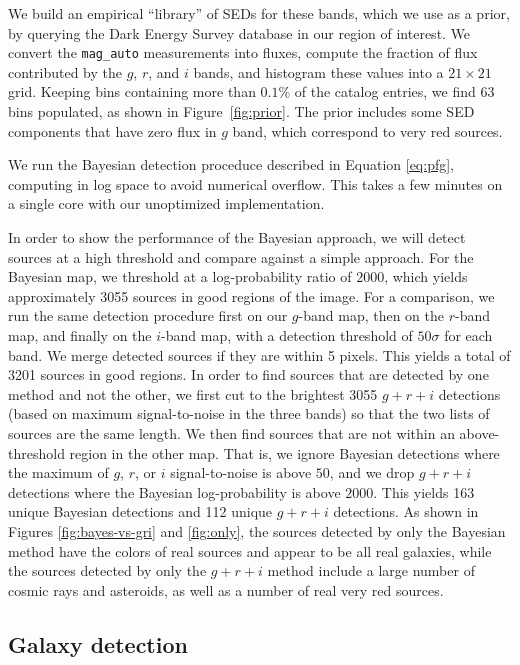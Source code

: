 \documentclass[letterpaper,preprint]{aastex62}
\newcommand{\figref}[1]{\mbox{Figure~\ref{#1}}}
\begin{document}
We build an empirical ``library'' of SEDs for these bands, which we
use as a prior, by querying the Dark Energy Survey database in our
region of interest.  We convert the \texttt{mag\_auto} measurements
into fluxes, compute the fraction of flux contributed by the $g$, $r$,
and $i$ bands, and histogram these values into a $21 \times 21$ grid.
Keeping bins containing more than $0.1 \%$ of the catalog entries, we
find 63 bins populated, as shown in \figref{fig:prior}.  The prior
includes some SED components that have zero flux in $g$ band, which
correspond to very red sources.


We run the Bayesian detection proceduce described in Equation
\ref{eq:pfg}, computing in log space to avoid numerical overflow.
This takes a few minutes on a single core with our unoptimized
implementation.


In order to show the performance of the Bayesian approach, we will
detect sources at a high threshold and compare against a simple
approach.  For the Bayesian map, we threshold at a log-probability
ratio of $2000$, which yields approximately 3055 sources in good
regions of the image.  For a comparison, we run the same detection
procedure first on our $g$-band map, then on the $r$-band map, and
finally on the $i$-band map, with a detection threshold of $50 \sigma$
for each band.  We merge detected sources if they are within 5 pixels.
This yields a total of 3201 sources in good regions.  In order to find
sources that are detected by one method and not the other, we first
cut to the brightest 3055 $g+r+i$ detections (based on maximum
signal-to-noise in the three bands) so that the two lists of sources
are the same length.  We then find sources that are not within an
above-threshold region in the other map.  That is, we ignore Bayesian
detections where the maximum of $g$, $r$, or $i$ signal-to-noise is
above $50$, and we drop $g+r+i$ detections where the Bayesian
log-probability is above $2000$.  This yields 163 unique Bayesian
detections and 112 unique $g+r+i$ detections.  As shown in Figures
\ref{fig:bayes-vs-gri} and \ref{fig:only}, the sources detected by
only the Bayesian method have the colors of real sources and appear to
be all real galaxies, while the sources detected by only the $g+r+i$
method include a large number of cosmic rays and asteroids, as well as
a number of real very red sources.


\subsection{Galaxy detection}
\end{document}
